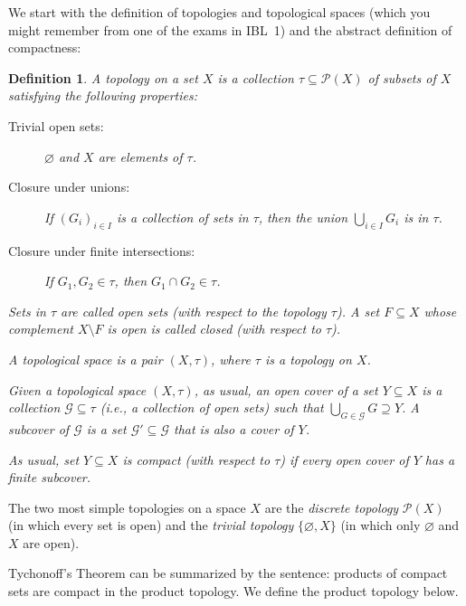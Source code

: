 \documentclass[12pt]{article}
\theoremstyle{bigskipthmstyle}
\theoremstyle{thmstyle}
\theoremstyle{plainstyle}
\newtheorem{definition}[theorem]{Definition}
\newcommand{\cG}{\mathcal{G}}
\newcommand{\cP}{\mathcal{P}}
\begin{document}
We start with the definition of topologies and topological spaces (which you might remember from one
of the exams in IBL~1) and the abstract definition of compactness:
\begin{definition}
  A \emph{topology} on a set $X$ is a collection $\tau\subseteq\cP(X)$ of subsets of $X$ satisfying
  the following properties:
  \begin{description}
  \item[Trivial open sets:] $\varnothing$ and $X$ are elements of $\tau$.
  \item[Closure under unions:] If $(G_i)_{i\in I}$ is a collection of sets in $\tau$, then the union
    $\bigcup_{i\in I} G_i$ is in $\tau$.
  \item[Closure under finite intersections:] If $G_1,G_2\in\tau$, then $G_1\cap G_2\in\tau$.
  \end{description}

  Sets in $\tau$ are called \emph{open sets} (with respect to the topology $\tau$). A set
  $F\subseteq X$ whose complement $X\setminus F$ is open is called \emph{closed} (with respect to
  $\tau$).

  A \emph{topological space} is a pair $(X,\tau)$, where $\tau$ is a topology on $X$.

  Given a topological space $(X,\tau)$, as usual, an open cover of a set $Y\subseteq X$ is a
  collection $\cG\subseteq\tau$ (i.e., a collection of open sets) such that $\bigcup_{G\in\cG}
  G\supseteq Y$. A \emph{subcover} of $\cG$ is a set $\cG'\subseteq\cG$ that is also a cover of $Y$.

  As usual, set $Y\subseteq X$ is \emph{compact} (with respect to $\tau$) if every open cover of $Y$
  has a finite subcover.
\end{definition}

The two most simple topologies on a space $X$ are the \emph{discrete topology} $\cP(X)$ (in which
every set is open) and the \emph{trivial topology} $\{\varnothing, X\}$ (in which only $\varnothing$
and $X$ are open).

Tychonoff's Theorem can be summarized by the sentence: products of compact sets are compact in the
product topology. We define the product topology below.
\end{document}
